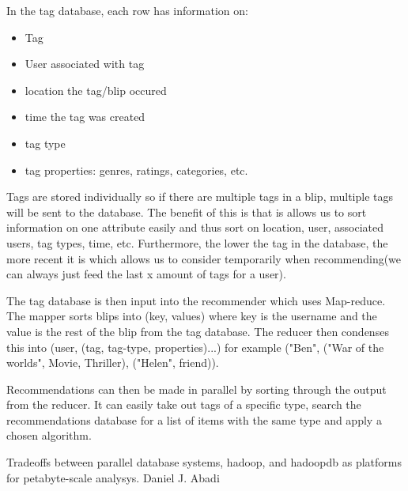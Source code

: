 \documentclass[11pt]{article}
\begin{document}
In the tag database, each row has information on:

\begin{itemize}
\item Tag
\item User associated with tag
\item location the tag/blip occured
\item time the tag was created
\item tag type
\item tag properties: genres, ratings, categories, etc.
\end{itemize}

Tags are stored individually so if there are multiple tags in a blip, multiple tags will be sent to the database. The benefit of this is that is allows us to sort information on one attribute easily and thus sort on location, user, associated users, tag types, time, etc. Furthermore, the lower the tag in the database, the more recent it is which allows us to consider temporarily when recommending(we can always just feed the last x amount of tags for a user). 

The tag database is then input into the recommender which uses Map-reduce. The mapper sorts blips into (key, values) where key is the username and the value is the rest of the blip from the tag database. The reducer then condenses this into (user, (tag, tag-type, properties)...) for example ("Ben", ("War of the worlds", Movie, Thriller), ("Helen", friend)).

Recommendations can then be made in parallel by sorting through the output from the reducer. It can easily take out tags of a specific type, search the recommendations database for a list of items with the same type and apply a chosen algorithm.

\begin{thebibliography}{9}

Tradeoffs between parallel database systems, hadoop, and hadoopdb as platforms for petabyte-scale analysys. Daniel J. Abadi

\end{thebibliography}
\end{document}
